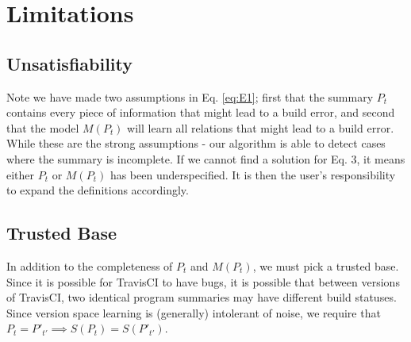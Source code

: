 \section{Limitations}

\subsection{Unsatisfiability}
Note we have made two assumptions in Eq. \ref{eq:E1}; first that the summary $P_t$ contains every piece of information that might lead to a build error, and second that the model $M(P_t)$ will learn all relations that might lead to a build error.
While these are the strong assumptions - our algorithm is able to detect cases where the summary is incomplete.
If we cannot find a solution for Eq. 3, it means either $P_t$ or $M(P_t)$ has been underspecified.
It is then the user's responsibility to expand the definitions accordingly.

\subsection{Trusted Base}
In addition to the completeness of $P_t$ and $M(P_t)$, we must pick a trusted base.
Since it is possible for TravisCI to have bugs, it is possible that between versions of TravisCI, two identical program summaries may have different build statuses.
Since version space learning is (generally) intolerant of noise, we require that
$P_t = P'_{t'} \implies S(P_t) = S(P'_{t'})$.
